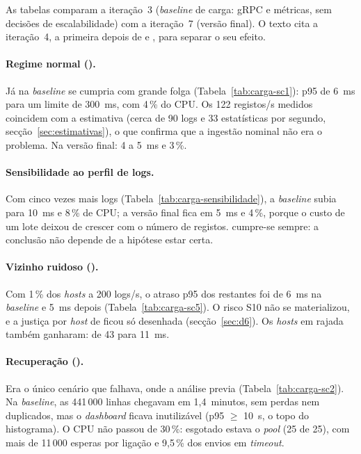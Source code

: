 As tabelas comparam a iteração~3 (\emph{baseline} de carga: gRPC e métricas, sem decisões de escalabilidade) com a
iteração~7 (versão final). O texto cita a iteração~4, a primeira depois de  e , para separar o seu
efeito.


\paragraph{Regime normal ().}
Já na \emph{baseline} se cumpria com grande folga (Tabela~\ref{tab:carga-sc1}): p95 de 6~ms para um limite de
300~ms, com 4\,\% do CPU. Os 122 registos/s medidos coincidem com a estimativa (cerca de 90 logs e 33 estatísticas
por segundo, secção~\ref{sec:estimativas}), o que confirma que a ingestão nominal não era o problema. Na versão
final: 4 a 5~ms e 3\,\%.


\paragraph{Sensibilidade ao perfil de logs.}
Com cinco vezes mais logs (Tabela~\ref{tab:carga-sensibilidade}), a \emph{baseline} subia para 10~ms e 8\,\% de
CPU; a versão final fica em 5~ms e 4\,\%, porque o custo de um lote deixou de crescer com o número de registos.
 cumpre-se sempre: a conclusão não depende de a hipótese estar certa.


\paragraph{Vizinho ruidoso ().}
Com 1\,\% dos \emph{hosts} a 200 logs/s, o atraso p95 dos restantes foi de 6~ms na \emph{baseline} e 5~ms depois
(Tabela~\ref{tab:carga-sc5}). O risco S10 não se materializou, e a justiça por \emph{host} de  ficou só
desenhada (secção~\ref{sec:d6}). Os \emph{hosts} em rajada também ganharam: de 43 para 11~ms.


\paragraph{Recuperação ().}
Era o único cenário que falhava, onde a análise previa (Tabela~\ref{tab:carga-sc2}). Na \emph{baseline}, as
441\,000 linhas chegavam em 1,4~minutos, sem perdas nem duplicados, mas o \emph{dashboard} ficava inutilizável (p95
$\ge$ 10~s, o topo do histograma). O CPU não passou de 30\,\%: esgotado estava o \emph{pool} (25 de 25), com mais
de 11\,000 esperas por ligação e 9,5\,\% dos envios em \emph{timeout}.

